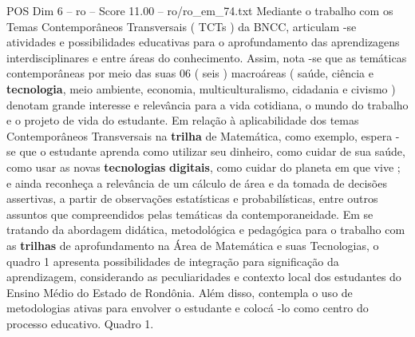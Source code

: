 \begin{textsample}{POS Dim 6 – ro – Score 11.00 – ro/ro\_em\_74.txt}
Mediante o trabalho com os Temas Contemporâneos Transversais ( TCTs ) da BNCC, articulam -se atividades e possibilidades educativas para o aprofundamento das aprendizagens interdisciplinares e entre áreas do conhecimento.
Assim, nota -se que as temáticas contemporâneas por meio das suas 06 ( seis ) macroáreas ( saúde, ciência e \textbf{tecnologia}, meio ambiente, economia, multiculturalismo, cidadania e civismo ) denotam grande interesse e relevância para a vida cotidiana, o mundo do trabalho e o projeto de vida do estudante.
Em relação à aplicabilidade dos temas Contemporâneos Transversais na \textbf{trilha} de Matemática, como exemplo, espera -se que o estudante aprenda como utilizar seu dinheiro, como cuidar de sua saúde, como usar as novas \textbf{tecnologias} \textbf{digitais}, como cuidar do planeta em que vive ; e ainda reconheça a relevância de um cálculo de área e da tomada de decisões assertivas, a partir de observações estatísticas e probabilísticas, entre outros assuntos que compreendidos pelas temáticas da contemporaneidade.
Em se tratando da abordagem didática, metodológica e pedagógica para o trabalho com as \textbf{trilhas} de aprofundamento na Área de Matemática e suas Tecnologias, o quadro 1 apresenta possibilidades de integração para significação da aprendizagem, considerando as peculiaridades e contexto local dos estudantes do Ensino Médio do Estado de Rondônia.
Além disso, contempla o uso de metodologias ativas para envolver o estudante e colocá -lo como centro do processo educativo.
Quadro 1.

\end{textsample}
